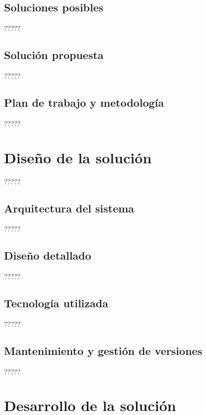 \documentclass[11pt,spanish,listoffigures]{tfgetsinf}
\begin{document}
\section{Soluciones posibles}

?????

\section{Solución propuesta}

?????

\section{Plan de trabajo y metodología}

?????


\chapter{Diseño de la solución}

?????

\section{Arquitectura del sistema}

?????

\section{Diseño detallado}

?????

\section{Tecnología utilizada}

?????

\section{Mantenimiento y gestión de versiones}

?????


\chapter{Desarrollo de la solución}
\end{document}
